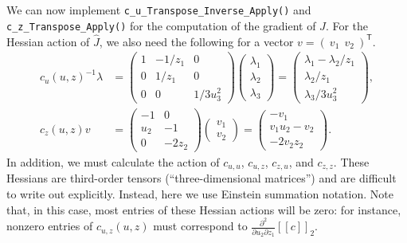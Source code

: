 \documentclass{article}
\newcommand{\trp}{^{\mathsf{T}}}
\begin{document}
We can now implement \texttt{c\_u\_Transpose\_Inverse\_Apply()} and
\texttt{c\_z\_Transpose\_Apply()} for the computation of the gradient of $\hat{J}$.
For the Hessian action of $\hat{J}$, we also need the following for a vector $v = (~v_{1}~~v_{2}~)\trp$.
\begin{align*}
    c_{u}(u, z)^{-1} \lambda
    &= \left(\begin{array}{ccc}
        1 & -1/z_{1} & 0 \\
        0 & 1/z_{1} & 0 \\
        0 & 0 & 1/3u_{3}^{2}
    \end{array}\right)
    \left(\begin{array}{c}
        \lambda_{1} \\ \lambda_{2} \\ \lambda_{3}
    \end{array}\right)
    = \left(\begin{array}{c}
        \lambda_{1} - \lambda_{2}/z_{1} \\
        \lambda_{2}/z_{1} \\
        \lambda_{3}/3u_{3}^{2}
    \end{array}\right),
    \\
    c_{z}(u, z) v
    &= \left(\begin{array}{cc}
        -1 & 0 \\
        u_{2} & -1 \\
        0 & -2z_{2}
    \end{array}\right)
    \left(\begin{array}{c}
        v_{1} \\ v_{2}
    \end{array}\right)
    = \left(\begin{array}{c}
        -v_{1} \\
        v_{1}u_{2} - v_{2} \\
        -2v_{2}z_{2}
    \end{array}\right).
\end{align*}
In addition, we must calculate the action of $c_{u,u}$, $c_{u,z}$, $c_{z,u}$, and $c_{z,z}$.
These Hessians are third-order tensors (``three-dimensional matrices'') and are difficult to write out explicitly.
Instead, here we use Einstein summation notation.
Note that, in this case, most entries of these Hessian actions will be zero: for instance, nonzero entries of $c_{u,z}(u,z)$ must correspond to $\frac{\partial^{2}}{\partial u_{2} \partial z_{1}}[\![c]\!]_{2}$.
\end{document}
